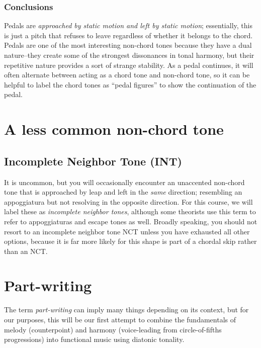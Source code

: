 \documentclass{book}
\begin{document}
\hypertarget{conclusions-42}{%
\subsubsection{Conclusions}\label{conclusions-42}}

Pedals are \emph{approached by static motion and left by static motion};
essentially, this is just a pitch that refuses to leave regardless of whether
it belongs to the chord. Pedals are one of the most interesting non-chord
tones because they have a dual nature--they create some of the strongest
dissonances in tonal harmony, but their repetitive nature provides a sort of
strange stability. As a pedal continues, it will often alternate between
acting as a chord tone and non-chord tone, so it can be helpful to label the
chord tones as ``pedal figures'' to show the continuation of the pedal.

\hypertarget{a-less-common-non-chord-tone}{%
\section{A less common non-chord tone}\label{a-less-common-non-chord-tone}}

\hypertarget{incomplete-neighbor-tone-int}{%
\subsection{Incomplete Neighbor Tone
(INT)}\label{incomplete-neighbor-tone-int}}

It is uncommon, but you will occasionally encounter an unaccented non-chord
tone that is approached by leap and left in the \emph{same} direction;
resembling an appoggiatura but not resolving in the opposite direction. For
this course, we will label these as \emph{incomplete neighbor tones}, although
some theorists use this term to refer to appoggiaturas and escape tones as
well. Broadly speaking, you should not resort to an incomplete neighbor tone
NCT unless you have exhausted all other options, because it is far more likely
for this shape is part of a chordal skip rather than an NCT.

\hypertarget{part-writing}{%
\section{Part-writing}\label{part-writing}}

The term \emph{part-writing} can imply many things depending on its context,
but for our purposes, this will be our first attempt to combine the
fundamentals of melody (counterpoint) and harmony (voice-leading from
circle-of-fifths progressions) into functional music using diatonic tonality.
\end{document}

